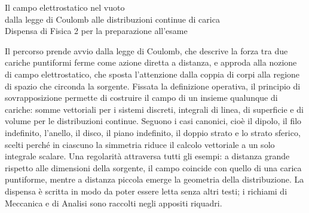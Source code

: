 \documentclass[11pt,a4paper]{article}
\begin{document}
\begin{center}
{\LARGE Il campo elettrostatico nel vuoto\\[0.4ex]
dalla legge di Coulomb alle distribuzioni continue di carica}\\[1.2ex]
{\large Dispensa di Fisica 2 per la preparazione all'esame}
\end{center}

\vspace{1em}

\noindent
Il percorso prende avvio dalla legge di Coulomb, che descrive la forza tra due cariche puntiformi ferme come azione diretta a distanza, e approda alla nozione di campo elettrostatico, che sposta l'attenzione dalla coppia di corpi alla regione di spazio che circonda la sorgente. Fissata la definizione operativa, il principio di sovrapposizione permette di costruire il campo di un insieme qualunque di cariche: somme vettoriali per i sistemi discreti, integrali di linea, di superficie e di volume per le distribuzioni continue. Seguono i casi canonici, cioè il dipolo, il filo indefinito, l'anello, il disco, il piano indefinito, il doppio strato e lo strato sferico, scelti perché in ciascuno la simmetria riduce il calcolo vettoriale a un solo integrale scalare. Una regolarità attraversa tutti gli esempi: a distanza grande rispetto alle dimensioni della sorgente, il campo coincide con quello di una carica puntiforme, mentre a distanza piccola emerge la geometria della distribuzione. La dispensa è scritta in modo da poter essere letta senza altri testi; i richiami di Meccanica e di Analisi sono raccolti negli appositi riquadri.

\medskip
\end{document}
